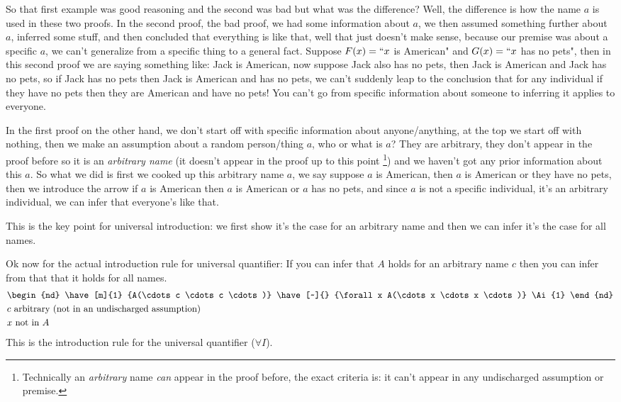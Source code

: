 So that first example was good reasoning and the second was bad but what was the difference? Well, the difference is how the name $a$ is used in these two proofs. In the second proof, the bad proof, we had some information about $a$, we then assumed something further about $a$, inferred some stuff, and then concluded that everything is like that, well that just doesn't make sense, because our premise was about a specific $a$, we can't generalize from a specific thing to a general fact. Suppose $F(x)=``x$ is American" and $G(x)=``x$ has no pets", then in this second proof we are saying something like: Jack is American, now suppose Jack also has no pets, then Jack is American and Jack has no pets, so if Jack has no pets then Jack is American and has no pets, we can't suddenly leap to the conclusion that for any individual if they have no pets then they are American and have no pets! You can't go from specific information about someone to inferring it applies to everyone. 

In the first proof on the other hand, we don't start off with specific information about anyone/anything, at the top we start off with nothing, then we make an assumption about a random person/thing $a$, who or what is $a$? They are arbitrary, they don't appear in the proof before so it is an \textit{arbitrary name} (it doesn't appear in the proof up to this point \footnote{Technically an \textit{arbitrary} name \textit{can} appear in the proof before, the exact criteria is: it can't appear in any undischarged assumption or premise.}) and we haven't got any prior information about this $a$. So what we did is first we cooked up this arbitrary name $a$, we say suppose $a$ is American, then $a$ is American or they have no pets, then we introduce the arrow if $a$ is American then $a$ is American or $a$ has no pets, and since $a$ is not a specific individual, it's an arbitrary individual, we can infer that everyone's like that.

This is the key point for universal introduction: we first show it's the case for an arbitrary name and then we can infer it's the case for all names.


Ok now for the actual introduction rule for universal quantifier:
If you can infer that $A$ holds for an arbitrary name $c$ then you can infer from that that it holds for all names.
\begin{align}
    &\begin{nd}
        \have[m]{1} {A(\cdots c \cdots c \cdots)} 
        \have[~]{} {\forall x A(\cdots x \cdots x \cdots)} \Ai{1} 
    \end{nd}\nonumber \\
    &c \text{ arbitrary (not in an undischarged assumption)} \nonumber \\
    &x \text{ not in }A \nonumber
\end{align}
This is the introduction rule for the universal quantifier ($\forall I$). \\


